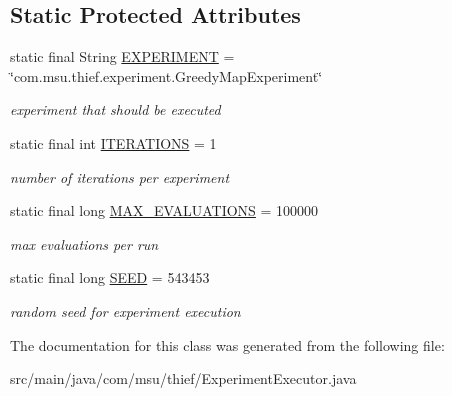 \subsection*{Static Protected Attributes}
\begin{DoxyCompactItemize}
\item 
\hypertarget{classcom_1_1msu_1_1thief_1_1ExperimentExecutor_aca5fcadd393be1d2217c4ab115b3429d}{static final String \hyperlink{classcom_1_1msu_1_1thief_1_1ExperimentExecutor_aca5fcadd393be1d2217c4ab115b3429d}{E\-X\-P\-E\-R\-I\-M\-E\-N\-T} = \char`\"{}com.\-msu.\-thief.\-experiment.\-Greedy\-Map\-Experiment\char`\"{}}\label{classcom_1_1msu_1_1thief_1_1ExperimentExecutor_aca5fcadd393be1d2217c4ab115b3429d}

\begin{DoxyCompactList}\small\item\em experiment that should be executed \end{DoxyCompactList}\item 
\hypertarget{classcom_1_1msu_1_1thief_1_1ExperimentExecutor_ac1bc99ce39c691208254816b6b6b25f1}{static final int \hyperlink{classcom_1_1msu_1_1thief_1_1ExperimentExecutor_ac1bc99ce39c691208254816b6b6b25f1}{I\-T\-E\-R\-A\-T\-I\-O\-N\-S} = 1}\label{classcom_1_1msu_1_1thief_1_1ExperimentExecutor_ac1bc99ce39c691208254816b6b6b25f1}

\begin{DoxyCompactList}\small\item\em number of iterations per experiment \end{DoxyCompactList}\item 
\hypertarget{classcom_1_1msu_1_1thief_1_1ExperimentExecutor_aad994fb9a65c03a9bf55cb61a8d3a6c2}{static final long \hyperlink{classcom_1_1msu_1_1thief_1_1ExperimentExecutor_aad994fb9a65c03a9bf55cb61a8d3a6c2}{M\-A\-X\-\_\-\-E\-V\-A\-L\-U\-A\-T\-I\-O\-N\-S} = 100000}\label{classcom_1_1msu_1_1thief_1_1ExperimentExecutor_aad994fb9a65c03a9bf55cb61a8d3a6c2}

\begin{DoxyCompactList}\small\item\em max evaluations per run \end{DoxyCompactList}\item 
\hypertarget{classcom_1_1msu_1_1thief_1_1ExperimentExecutor_a48f961c14e062053b22b3857316bfde8}{static final long \hyperlink{classcom_1_1msu_1_1thief_1_1ExperimentExecutor_a48f961c14e062053b22b3857316bfde8}{S\-E\-E\-D} = 543453}\label{classcom_1_1msu_1_1thief_1_1ExperimentExecutor_a48f961c14e062053b22b3857316bfde8}

\begin{DoxyCompactList}\small\item\em random seed for experiment execution \end{DoxyCompactList}\end{DoxyCompactItemize}


The documentation for this class was generated from the following file\-:\begin{DoxyCompactItemize}
\item 
src/main/java/com/msu/thief/Experiment\-Executor.\-java\end{DoxyCompactItemize}
